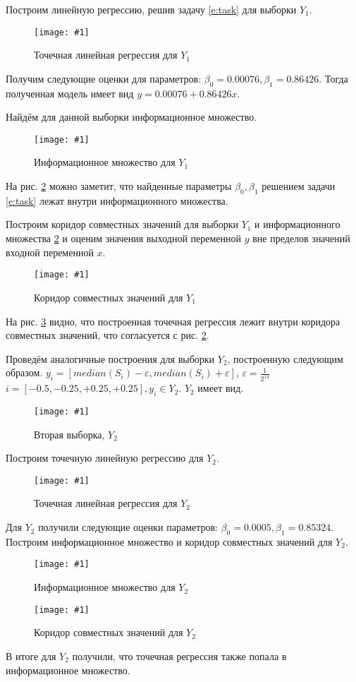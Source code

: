 \documentclass[a4paper,12pt]{article}
\newcommand{\plot}[3]{
    \begin{figure}[H]
        \begin{center}
            \texttt{[image: \#1]}
            \caption{#2}
            \label{#3}
        \end{center}
    \end{figure}
}
\begin{document}

    Построим линейную регрессию, решив задачу \ref{e:task} для выборки $ Y_1 $.
    \plot{PointRegressionY1}{Точечная линейная регрессия для $ Y_1 $}{p:regressionY1}
    
    Получим следующие оценки для параметров: $ \beta_0 = 0.00076, \beta_1 = 0.86426 $.
    Тогда полученная модель имеет вид $ y = 0.00076 + 0.86426 x $.

    Найдём для данной выборки информационное множество.
    \plot{InformSetY1}{Информационное множество для $ Y_1 $}{p:informSetY1}

    На рис. \ref{p:informSetY1} можно заметит, что найденные параметры
    $ \beta_0, \beta_1 $ решением задачи \ref{e:task} лежат внутри информационного множества.

    Построим коридор совместных значений для выборки $ Y_1 $ и информационного множества \ref{p:informSetY1}
    и оценим значения выходной переменной $ y $ вне пределов значений входной переменной $ x $.
    \plot{InformSetCorridorY1}{Коридор совместных значений для $ Y_1 $}{p:informSetCorridorY1}

    На рис. \ref{p:informSetCorridorY1} видно, что построенная точечная регрессия лежит внутри коридора совместных значений,
    что согласуется с рис. \ref{p:informSetY1}.

    Проведём аналогичные построения для выборки $ Y_2 $, построенную следующим образом.
    $ y_i = [median(S_i) - \varepsilon, median(S_i) + \varepsilon] $, $ \varepsilon = \frac{1}{2^{14}} $
    $ i = [-0.5, -0.25, +0.25, +0.25], y_i \in Y_2 $.
    $ Y_2 $ имеет вид.
    \plot{Y2}{Вторая выборка, $ Y_2 $}{p:sampleY2}
    

    Построим точечную линейную регрессию для $ Y_2 $.
    \plot{PointRegressionY2}{Точечная линейная регрессия для $ Y_2 $}{p:regressionY2}

    Для $ Y_2 $ получили следующие оценки параметров: $ \beta_0 = 0.0005, \beta_1 = 0.85324 $.
    Построим информационное множество и коридор совместных значений для $ Y_2 $.

    \plot{InformSetY2}{Информационное множество для $ Y_2 $}{p:informSetY2}
    \plot{InformSetCorridorY2}{Коридор совместных значений для $ Y_2 $}{p:informSetCorridorY2}

    В итоге для $ Y_2 $ получили, что точечная регрессия также попала в информационное множество.
\end{document}
